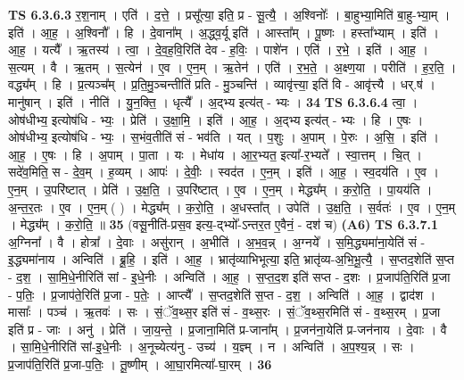 \documentclass[17pt]{extarticle}
\begin{document}
                  \newline
                                \textbf{ TS 6.3.6.3} \newline
                  र॒श॒नाम् । एति॑ । द॒त्ते॒ । प्रसू᳚त्या॒ इति॒ प्र - सू॒त्यै॒ । अ॒श्विनोः᳚ । बा॒हुभ्या॒मिति॑ बा॒हु-भ्या॒म् । इति॑ । आ॒ह॒ । अ॒श्विनौ᳚ । हि । दे॒वाना᳚म् । अ॒द्ध्व॒र्यू इति॑ । आस्ता᳚म् । पू॒ष्णः । हस्ता᳚भ्याम् । इति॑ । आ॒ह॒ । यत्यै᳚ । ऋ॒तस्य॑ । त्वा॒ । दे॒व॒ह॒वि॒रिति॑ देव - ह॒विः॒ । पाशे॑न । एति॑ । र॒भे॒ । इति॑ । आ॒ह॒ । स॒त्यम् । वै । ऋ॒तम् । स॒त्येन॑ । ए॒व । ए॒न॒म् । ऋ॒तेन॑ । एति॑ । र॒भ॒ते॒ । अ॒क्ष्ण॒या । परीति॑ । ह॒र॒ति॒ । वद्ध्य᳚म् । हि । प्र॒त्यञ्च᳚म् । प्र॒ति॒मु॒ञ्चन्तीति॑ प्रति - मु॒ञ्चन्ति॑ । व्यावृ॑त्त्या॒ इति॑ वि - आवृ॑त्त्यै । धर्.ष॑ । मानु॑षान् । इति॑ । नीति॑ । यु॒न॒क्ति॒ । धृत्यै᳚ । अ॒द्भ्य इत्य॑त् - भ्यः । \textbf{  34} \newline
                  \newline
                                \textbf{ TS 6.3.6.4} \newline
                  त्वा॒ । ओष॑धीभ्य॒ इत्योष॑धि - भ्यः॒ । प्रेति॑ । उ॒क्षा॒मि॒ । इति॑ । आ॒ह॒ । अ॒द्भ्य इत्य॑त् - भ्यः । हि । ए॒षः । ओष॑धीभ्य॒ इत्योष॑धि - भ्यः॒ । स॒भंव॒तीति॑ सं - भव॑ति । यत् । प॒शुः । अ॒पाम् । पे॒रुः । अ॒सि॒ । इति॑ । आ॒ह॒ । ए॒षः । हि । अ॒पाम् । पा॒ता । यः । मेधा॑य । आ॒र॒भ्यत॒ इत्या᳚-र॒भ्यते᳚ । स्वा॒त्तम् । चि॒त् । सदे॑व॒मिति॒ स - दे॒व॒म् । ह॒व्यम् । आपः॑ । दे॒वीः॒ । स्वद॑त । ए॒न॒म् । इति॑ । आ॒ह॒ । स्व॒दय॑ति । ए॒व । ए॒न॒म् । उ॒परि॑ष्टात् । प्रेति॑ । उ॒क्ष॒ति॒ । उ॒परि॑ष्टात् । ए॒व । ए॒न॒म् । मेद्ध्य᳚म् । क॒रो॒ति॒ । पा॒यय॑ति । अ॒न्त॒र॒तः । ए॒व । ए॒न॒म् ( ) । मेद्ध्य᳚म् । क॒रो॒ति॒ । अ॒धस्ता᳚त् । उपेति॑ । उ॒क्ष॒ति॒ । स॒र्वतः॑ । ए॒व । ए॒न॒म् । मेद्ध्य᳚म् । क॒रो॒ति॒ ॥ \textbf{  35 } \newline
                  \newline
                      (वसू॒नीति॑-प्रस॒व इत्य॒-द्भ्यो᳚-ऽन्तर॒त ए॒वैनं॒ - दश॑ च)  \textbf{(A6)} \newline \newline
                                \textbf{ TS 6.3.7.1} \newline
                  अ॒ग्निना᳚ । वै । होत्रा᳚ । दे॒वाः । असु॑रान् । अ॒भीति॑ । अ॒भ॒व॒न्न् । अ॒ग्नये᳚ । स॒मि॒द्ध्यमा॑ना॒येति॑ सं - इ॒द्ध्यमा॑नाय । अन्विति॑ । ब्रू॒हि॒ । इति॑ । आ॒ह॒ । भ्रातृ॑व्याभिभूत्या॒ इति॒ भ्रातृ॑व्य-अ॒भि॒भू॒त्यै॒ । स॒प्तद॒शेति॑ स॒प्त - द॒श॒ । सा॒मि॒धे॒नीरिति॑ सां - इ॒धे॒नीः । अन्विति॑ । आ॒ह॒ । स॒प्त॒द॒श इति॑ सप्त - द॒शः । प्र॒जाप॑ति॒रिति॑ प्र॒जा - प॒तिः॒ । प्र॒जाप॑ते॒रिति॑ प्र॒जा - प॒तेः॒ । आप्त्यै᳚ । स॒प्तद॒शेति॑ स॒प्त - द॒श॒ । अन्विति॑ । आ॒ह॒ । द्वाद॑श । मासाः᳚ । पञ्च॑ । ऋ॒तवः॑ । सः । सं॒ॅव॒थ्स॒र इति॑ सं - व॒थ्स॒रः । सं॒ॅव॒थ्स॒रमिति॑ सं - व॒थ्स॒रम् । प्र॒जा इति॑ प्र - जाः । अनु॑ । प्रेति॑ । जा॒य॒न्ते॒ । प्र॒जाना॒मिति॑ प्र-जाना᳚म् । प्र॒जन॑ना॒येति॑ प्र-जन॑नाय । दे॒वाः । वै । सा॒मि॒धे॒नीरिति॑ सां-इ॒धे॒नीः । अ॒नूच्येत्य॑नु - उच्य॑ । य॒ज्ञ्म् । न । अन्विति॑ । अ॒प॒श्य॒न्न् । सः । प्र॒जाप॑ति॒रिति॑ प्र॒जा-प॒तिः॒ । तू॒ष्णीम् । आ॒घा॒रमित्या᳚-घा॒रम् । \textbf{  36} \newline
\end{document}
